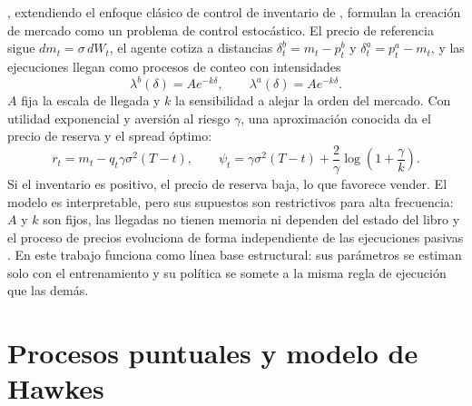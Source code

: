 \citet{AvellanedaStoikov2008}, extendiendo el enfoque clásico de control de inventario de \citet{HoStoll1981}, formulan la creación de mercado como un problema de control estocástico. El precio de referencia sigue $dm_t=\sigma\,dW_t$, el agente cotiza a distancias $\delta_t^b=m_t-p_t^b$ y $\delta_t^a=p_t^a-m_t$, y las ejecuciones llegan como procesos de conteo con intensidades
\begin{equation}
 \lambda^b(\delta)=A e^{-k\delta},
 \qquad
 \lambda^a(\delta)=A e^{-k\delta}.
 \label{eq:as-intensity}
\end{equation}
$A$ fija la escala de llegada y $k$ la sensibilidad a alejar la orden del mercado. Con utilidad exponencial y aversión al riesgo $\gamma$, una aproximación conocida da el precio de reserva y el spread óptimo:
\begin{equation}
 r_t=m_t-q_t\gamma\sigma^2(T-t),
 \qquad
 \psi_t=\gamma\sigma^2(T-t)+\frac{2}{\gamma}\log\!\left(1+\frac{\gamma}{k}\right).
 \label{eq:as-quotes}
\end{equation}
Si el inventario es positivo, el precio de reserva baja, lo que favorece vender. El modelo es interpretable, pero sus supuestos son restrictivos para alta frecuencia: $A$ y $k$ son fijos, las llegadas no tienen memoria ni dependen del estado del libro y el proceso de precios evoluciona de forma independiente de las ejecuciones pasivas \citep{AvellanedaStoikov2008,LalorSwishchuk2024}. En este trabajo funciona como línea base estructural: sus parámetros se estiman solo con el entrenamiento y su política se somete a la misma regla de ejecución que las demás.

\section{Procesos puntuales y modelo de Hawkes}
\label{sec:hawkes-multiescala}

